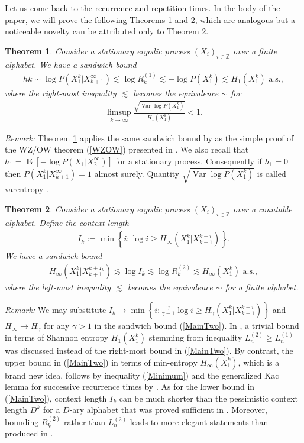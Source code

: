 \documentclass[a4paper]{article}
\newcommand{\kwad}[1]{\left[ #1 \right]}
\newcommand{\klam}[1]{\left\{ #1 \right\}}
\DeclareMathOperator{\var}{Var}
\DeclareMathOperator{\mean}{\mathbf{E}}
\newtheorem{theorem}{Theorem}
\begin{document}
Let us come back to the recurrence and repetition times.  In the body of
the paper, we will prove the following Theorems \ref{theoMainOne} and
\ref{theoMainTwo}, which are analogous but a noticeable novelty can be
attributed only to Theorem \ref{theoMainTwo}.
\begin{theorem}
  \label{theoMainOne}
  Consider a stationary ergodic process $(X_i)_{i\in\mathbb{Z}}$ over
  a finite alphabet. We have a sandwich bound
  \begin{align}
    hk\sim
    \log P(X_1^k|X_{k+1}^\infty)\lesssim
    \log R^{(1)}_k\lesssim
    -\log P(X_1^k)\lesssim
    H_1(X_1^k)
    \text{ a.s.},
  \end{align}
  where the right-most inequality $\lesssim$ becomes the equivalence
  $\sim$ for
  \begin{align}
    \limsup_{k\to\infty} \frac{\sqrt{\var\log P(X_1^k)}}{H_1(X_1^k)}<1.
  \end{align}
\end{theorem}
\emph{Remark:} Theorem \ref{theoMainOne} applies the same sandwich
bound by \citet{Kontoyiannis98} as the simple proof of the WZ/OW
theorem (\ref{WZOW}) presented in \citep[Theorem 9.12]{Debowski21}.
We also recall that $h_1=\mean\kwad{-\log P(X_1|X_2^\infty)}$ for a
stationary process. Consequently if $h_1=0$ then
$P(X_1^k|X_{k+1}^\infty)=1$ almost surely. Quantity $\sqrt{\var\log
  P(X_1^k)}$ is called varentropy \citep{KontoyiannisVerdu13}.

\begin{theorem}
  \label{theoMainTwo}
  Consider a stationary ergodic process $(X_i)_{i\in\mathbb{Z}}$ over
  a countable alphabet. Define the context length
  \begin{align}
    \label{ContextLength}
    I_k:=\min\klam{i:\log i\ge H_\infty(X_1^k|X_{k+1}^{k+i})}.
  \end{align}
  We have a sandwich bound 
  \begin{align}
    \label{MainTwo}
    H_\infty(X_1^k|X_{k+1}^{k+I_k})\lesssim
    \log I_k\lesssim
    \log R^{(2)}_k\lesssim
    H_\infty(X_1^k)
    \text{ a.s.}
    ,
  \end{align}
  where the left-most inequality $\lesssim$ becomes the equivalence
  $\sim$ for a finite alphabet.
\end{theorem}
\emph{Remark:} We may substitute
$I_k\to\min\klam{i:\frac{\gamma}{\gamma-1}\log i\ge
  H_\gamma(X_1^k|X_{k+1}^{k+i})}$ and $H_\infty\to H_\gamma$ for any
$\gamma>1$ in the sandwich bound (\ref{MainTwo}).  In
\citep{Debowski18b,Debowski21}, a trivial bound in terms of Shannon
entropy $H_1(X_1^k)$ stemming from inequality $L^{(2)}_n\ge L^{(1)}_n$
was discussed instead of the right-most bound in (\ref{MainTwo}). By
contrast, the upper bound in (\ref{MainTwo}) in terms of min-entropy
$H_\infty(X_1^k)$, which is a brand new idea, follows by inequality
(\ref{Minimum}) and the generalized Kac lemma for successive
recurrence times by \citet{ChenMoy59}. As for the lower bound in
(\ref{MainTwo}), context length $I_k$ can be much shorter than the
pessimistic context length $D^k$ for a $D$-ary alphabet that was
proved sufficient in \citep[Theorem 8]{Debowski18b}. Moreover,
bounding $R^{(2)}_k$ rather than $L^{(2)}_n$ leads to more elegant
statements than produced in \citep{Debowski18b,Debowski21}.
\end{document}
